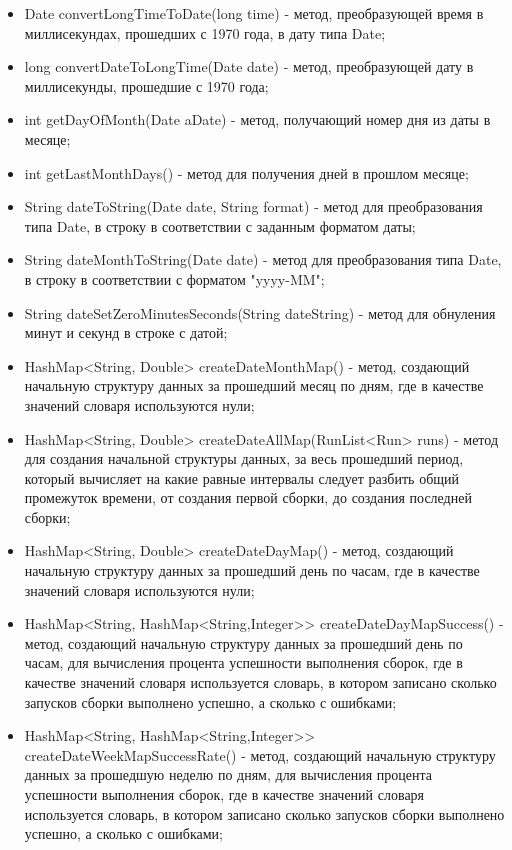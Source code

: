 \begin{itemize}
	\item Date convertLongTimeToDate(long time) - метод, преобразующей время в миллисекундах, прошедших с 1970 года, в дату типа Date;
	\item long convertDateToLongTime(Date date) - метод, преобразующей дату в миллисекунды, прошедшие с 1970 года;
	\item int getDayOfMonth(Date aDate) - метод, получающий номер дня из даты в месяце;
	\item int getLastMonthDays() - метод для получения дней в прошлом месяце;
	\item String dateToString(Date date, String format) - метод для преобразования типа Date, в строку в соответствии с заданным форматом даты;
	\item String dateMonthToString(Date date) - метод для преобразования типа Date, в строку в соответствии с форматом "yyyy-MM";
	\item String dateSetZeroMinutesSeconds(String dateString) - метод для обнуления минут и секунд в строке с датой;
	\item HashMap<String, Double> createDateMonthMap() - метод, создающий начальную структуру данных за прошедший месяц по дням, где в качестве значений словаря используются нули;
	\item HashMap<String, Double> createDateAllMap(RunList<Run> runs) - метод для создания начальной структуры данных, за весь прошедший период, который вычисляет на какие равные интервалы следует разбить общий промежуток времени, от создания первой сборки, до создания последней сборки;
	\item HashMap<String, Double> createDateDayMap() - метод, создающий начальную структуру данных за прошедший день по часам, где в качестве значений словаря используются нули;
	\item HashMap<String, HashMap<String,Integer>> createDateDayMapSuccess() - метод, создающий начальную структуру данных за прошедший день по часам, для вычисления процента успешности выполнения сборок, где в качестве значений словаря используется словарь, в котором записано сколько запусков сборки выполнено успешно, а сколько с ошибками;
	\item HashMap<String, HashMap<String,Integer>> createDateWeekMapSuccessRate() - метод, создающий начальную структуру данных за прошедшую неделю по дням, для вычисления процента успешности выполнения сборок, где в качестве значений словаря используется словарь, в котором записано сколько запусков сборки выполнено успешно, а сколько с ошибками;

\end{itemize}
